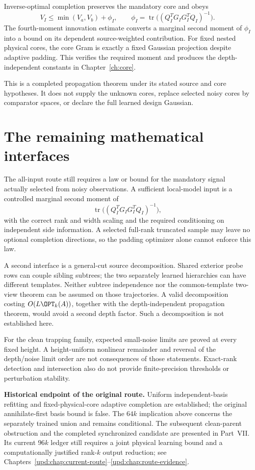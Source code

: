 \documentclass[11pt,oneside,openany,a4paper]{book}
\numberwithin{equation}{chapter}
\theoremstyle{definition}
\theoremstyle{remark}
\begin{document}
Inverse-optimal completion preserves the mandatory core and obeys
\[
 V_I\le\min(V_a,V_b)+\phi_I,
 \qquad
 \phi_I=\operatorname{tr}\bigl((Q_I^TG_IG_I^TQ_I)^{-1}\bigr).
\]
The fourth-moment innovation estimate converts a marginal second moment of $\phi_I$ into a bound on its dependent source-weighted contribution. For fixed nested physical cores, the core Gram is exactly a fixed Gaussian projection despite adaptive padding. This verifies the required moment and produces the depth-independent constants in Chapter~\ref{ch:core}.

This is a completed propagation theorem under its stated source and core hypotheses. It does not supply the unknown cores, replace selected noisy cores by comparator spaces, or declare the full learned design Gaussian.

\section{The remaining mathematical interfaces}
The all-input route still requires a law or bound for the mandatory signal actually selected from noisy observations. A sufficient local-model input is a controlled marginal second moment of
\[
 \operatorname{tr}\bigl((Q_I^TG_IG_I^TQ_I)^{-1}\bigr),
\]
with the correct rank and width scaling and the required conditioning on independent side information. A selected full-rank truncated sample may leave no optional completion directions, so the padding optimizer alone cannot enforce this law.

A second interface is a general-cut source decomposition. Shared exterior probe rows can couple sibling subtrees; the two separately learned hierarchies can have different templates. Neither subtree independence nor the common-template two-view theorem can be assumed on those trajectories. A valid decomposition costing $O(L\OPT_k(A))$, together with the depth-independent propagation theorem, would avoid a second depth factor. Such a decomposition is not established here.

For the clean trapping family, expected small-noise limits are proved at every fixed height. A height-uniform nonlinear remainder and reversal of the depth/noise limit order are not consequences of those statements. Exact-rank detection and intersection also do not provide finite-precision thresholds or perturbation stability.

\begin{statusbox}
\textbf{Historical endpoint of the original route.} Uniform independent-basis refitting and fixed-physical-core adaptive completion are established; the original annihilate-first basis bound is false. The $64k$ implication above concerns the separately trained union and remains conditional. The subsequent clean-parent obstruction and the completed synchronized candidate are presented in Part~VII. Its current $96k$ ledger still requires a joint physical learning bound and a computationally justified rank-$k$ output reduction; see Chapters~\ref{upd:chap:current-route}--\ref{upd:chap:route-evidence}.
\end{statusbox}
\end{document}
